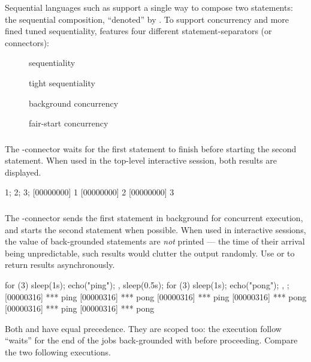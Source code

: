 Sequential languages such as \Cxx support a single way to compose two
statements: the sequential composition, ``denoted'' by \samp{;}.  To
support concurrency and more fined tuned sequentiality, \us features
four different statement-separators (or connectors):
\begin{description}
\item[\samp{;}] sequentiality
\item[\samp{|}] tight sequentiality
\item[\samp{,}] background concurrency
\item[\samp{\&}] fair-start concurrency
\end{description}

\subsubsection{\samp{;}}

The \samp{;}-connector waits for the first statement to finish before
starting the second statement.  When used in the top-level interactive
session, both results are displayed.

\begin{urbiscript}
1; 2; 3;
[00000000] 1
[00000000] 2
[00000000] 3
\end{urbiscript}

\subsubsection{\samp{,}}

The \samp{,}-connector sends the first statement in background for
concurrent execution, and starts the second statement when possible.
When used in interactive sessions, the value of back-grounded
statements are \emph{not} printed --- the time of their arrival being
unpredictable, such results would clutter the output randomly.  Use
 or  to return results
asynchronously.

\begin{urbiscript}
{
  for (3)
  {
    sleep(1s);
    echo("ping");
  },
  sleep(0.5s);
  for (3)
  {
    sleep(1s);
    echo("pong");
  },
};
[00000316] *** ping
[00000316] *** pong
[00000316] *** ping
[00000316] *** pong
[00000316] *** ping
[00000316] *** pong
\end{urbiscript}

Both \samp{;} and \samp{,} have equal precedence.  They are scoped too: the
execution follow ``waits'' for the end of the jobs back-grounded with
\samp{,} before proceeding.  Compare the two following executions.

